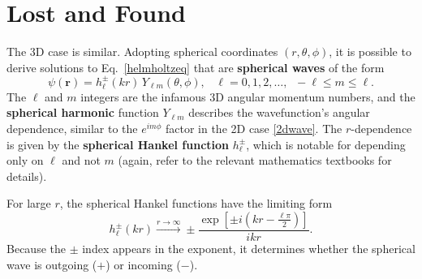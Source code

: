 \documentclass[pra,12pt]{revtex4-2}
\begin{document}
\section{Lost and Found}


The 3D case is similar.  Adopting spherical coordinates
$(r,\theta,\phi)$, it is possible to derive solutions to
Eq.~\eqref{helmholtzeq} that are \textbf{spherical waves} of the form
\begin{equation}
  \psi(\mathbf{r}) = h_\ell^\pm(kr)\,Y_{\ell m}(\theta,\phi),
  \;\;\; \ell = 0, 1, 2, \dots, \;\; -\ell \le m \le \ell.
\end{equation}
The $\ell$ and $m$ integers are the infamous 3D angular momentum
numbers, and the \textbf{spherical harmonic} function $Y_{\ell m}$
describes the wavefunction's angular dependence, similar to the
$e^{im\phi}$ factor in the 2D case \eqref{2dwave}.  The $r$-dependence
is given by the \textbf{spherical Hankel function} $h_\ell^\pm$, which
is notable for depending only on $\ell$ and not $m$ (again, refer to
the relevant mathematics textbooks for details).

For large $r$, the spherical Hankel functions have the limiting form
\begin{equation}
  h_\ell^\pm(kr) \overset{r\rightarrow\infty}{\longrightarrow} \pm \frac{\exp\!\left[\pm i\!\left(kr-\frac{\ell\pi}{2}\right)\right]}{ikr}.
\end{equation}
Because the $\pm$ index appears in the exponent, it determines whether
the spherical wave is outgoing ($+$) or incoming ($-$).
\end{document}

